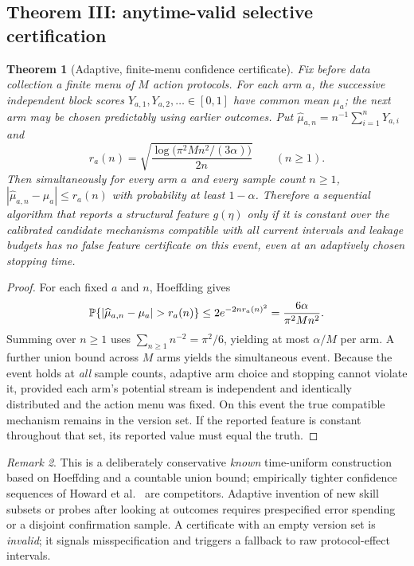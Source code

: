 \documentclass[11pt,a4paper]{article}
\newtheorem{theorem}{Theorem}[section]
\theoremstyle{definition}\newtheorem{definition}[theorem]{Definition}
\theoremstyle{remark}\newtheorem{remark}[theorem]{Remark}
\begin{document}
\subsection{Theorem III: anytime-valid selective certification}
\begin{theorem}[Adaptive, finite-menu confidence certificate]\label{thm:anytime}
Fix before data collection a finite menu of $M$ action protocols. For each arm $a$, the successive independent block scores $Y_{a,1},Y_{a,2},\ldots\in[0,1]$ have common mean $\mu_a$; the next arm may be chosen predictably using earlier outcomes. Put $\widehat\mu_{a,n}=n^{-1}\sum_{i=1}^nY_{a,i}$ and
\begin{equation}\label{eq:anytime}
 r_a(n)=\sqrt{\frac{\log\big(\pi^2 M n^2/(3\alpha)\big)}{2n}}\qquad(n\ge1).
\end{equation}
Then simultaneously for \emph{every} arm $a$ and every sample count $n\ge1$, $|\widehat\mu_{a,n}-\mu_a|\le r_a(n)$ with probability at least $1-\alpha$. Therefore a sequential algorithm that reports a structural feature $g(\eta)$ \emph{only if it is constant over the calibrated candidate mechanisms compatible with all current intervals and leakage budgets} has no false feature certificate on this event, even at an adaptively chosen stopping time.
\end{theorem}
\begin{proof}
For each fixed $a$ and $n$, Hoeffding gives
\[
 \Prb\{|\widehat\mu_{a,n}-\mu_a|>r_a(n)\}\le
 2e^{-2nr_a(n)^2}=\frac{6\alpha}{\pi^2 M n^2}.
\]
Summing over $n\ge1$ uses $\sum_{n\ge1}n^{-2}=\pi^2/6$, yielding at most $\alpha/M$ per arm. A further union bound across $M$ arms yields the simultaneous event. Because the event holds at \emph{all} sample counts, adaptive arm choice and stopping cannot violate it, provided each arm's potential stream is independent and identically distributed and the action menu was fixed. On this event the true compatible mechanism remains in the version set. If the reported feature is constant throughout that set, its reported value must equal the truth.\qedhere
\end{proof}
\begin{remark}
This is a deliberately conservative \emph{known} time-uniform construction based on Hoeffding and a countable union bound; empirically tighter confidence sequences of Howard et al.\ \citep{howard} are competitors. Adaptive invention of new skill subsets or probes after looking at outcomes requires prespecified error spending or a disjoint confirmation sample. A certificate with an empty version set is \emph{invalid}; it signals misspecification and triggers a fallback to raw protocol-effect intervals.
\end{remark}
\end{document}
